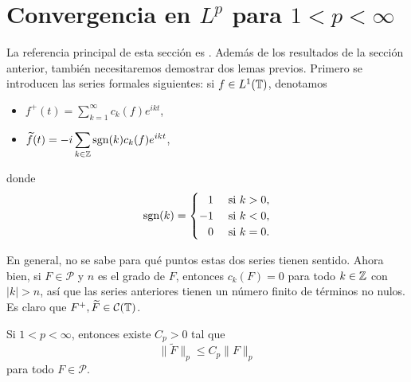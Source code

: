 \documentclass[a4paper, 12pt, oneside]{book}
\begin{document}
\section[Convergencia en \texorpdfstring{$L^p$}{Lp} para \texorpdfstring{$1<p<\infty$}{1<p<oo}]{Convergencia en \texorpdfstring{\boldmath$L^p$}{Lp} para \texorpdfstring{\boldmath$1<p<\infty$}{1<p<oo}}

La referencia principal de esta sección es \cite{miao}. Además de los resultados de la sección anterior, también necesitaremos demostrar dos lemas previos. Primero se introducen las series formales siguientes: si $f\in L^1(\mathbb T)$, denotamos
\begin{itemize}
    \item $\displaystyle f^+(t) = \sum_{k=1}^\infty c_k(f)e^{ikt}$,
    \item $\displaystyle \widetilde{f}(t) = -i\sum_{k\in\mathbb Z} \textup{sgn}(k)c_k(f)e^{ikt}$,
\end{itemize}
donde
\[\sgn(k) = \begin{cases}
    \phantom{-}1 & $ si $ k > 0, \\
    -1 & $ si $ k < 0, \\
    \phantom{-}0 & $ si $ k = 0.
\end{cases}\]

En general, no se sabe para qué puntos estas dos series tienen sentido. Ahora bien, si $F \in \mathcal{P}$ y $n$ es el grado de $F$, entonces $c_k(F) = 0$ para todo $k\in\mathbb Z$ con $|k|>n$, así que las series anteriores tienen un número finito de términos no nulos. Es claro que $F^+, \widetilde{F}\in \mathcal{C}(\mathbb T)$.

\begin{lemma}
    Si $1 < p < \infty$, entonces existe $C_p > 0$ tal que
    \[\|\widetilde{F}\|_p \leq C_p \|F\|_{p}\]
    para todo $F \in \mathcal{P}$.
\end{lemma}
\end{document}
